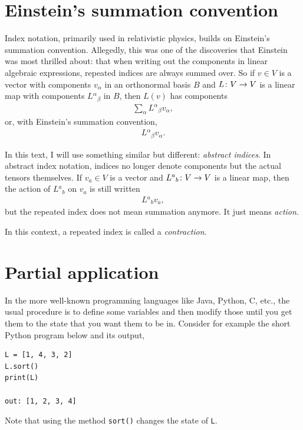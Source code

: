 \documentclass[english, 12pt]{article}
\begin{document}
\section{Einstein's summation convention}%
\label{sec:einstein_s_summation_convention}

Index notation, primarily used in relativistic physics, builds on Einstein's summation convention.
Allegedly, this was one of the discoveries that Einstein was most thrilled about: that when writing out the components in linear algebraic expressions, repeated indices are always summed over.
So if \(v \in V\) is a vector with components \(v_\alpha\) in an orthonormal basis \(B\) and \(L \colon V \to V\) is a linear map with components \(L{}^\alpha{}_\beta\) in \(B\), then \(L(v)\) has components
\begin{align*}
	\sum_\alpha L{}^\alpha{}_\beta v_\alpha,
\end{align*}
or, with Einstein's summation convention,
\begin{align*}
	L{}^\alpha{}_\beta v_\alpha.
\end{align*}

In this text, I will use something similar but different: \emph{abstract indices}.
In abstract index notation, indices no longer denote components but the actual tensors themselves.
If \(v_a \in V\) is a vector and \(L{}^a{}_b \colon V \to V\) is a linear map, then the action of \(L{}^a{}_b\) on \(v_a\) is still written
\begin{align*}
	L{}^a{}_b v_a,
\end{align*}
but the repeated index does not mean summation anymore.
It just means \emph{action}.

In this context, a repeated index is called a \emph{contraction}.


\section{Partial application}%
\label{sec:partial_application}

In the more well-known programming languages like Java, Python, C, etc., the usual procedure is to define some variables and then modify those until you get them to the state that you want them to be in.
Consider for example the short Python program below and its output,
\begin{verbatim}
L = [1, 4, 3, 2]
L.sort()
print(L)

out: [1, 2, 3, 4]
\end{verbatim}
Note that using the method \verb|sort()| changes the state of \verb|L|.
\end{document}
